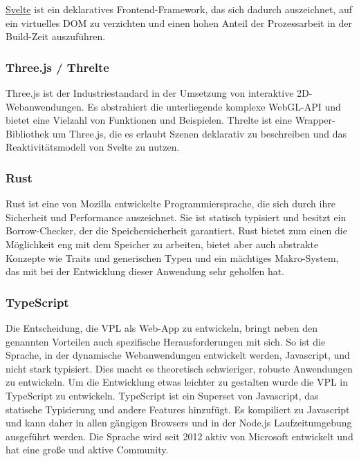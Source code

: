 \documentclass[ngerman]{article}
\begin{document}
\href{https://svelte.dev/}{Svelte} ist ein deklaratives Frontend-Framework, das sich dadurch auszeichnet, auf ein virtuelles DOM zu verzichten und einen hohen Anteil der Prozessarbeit in der Build-Zeit auszuführen.

\subsubsection{Three.js / Threlte}

Three.js ist der Industriestandard in der Umsetzung von interaktive 2D-Webanwendungen. Es abstrahiert die unterliegende komplexe WebGL-API und bietet eine Vielzahl von Funktionen und Beispielen. Threlte ist eine Wrapper-Bibliothek um Three.js, die es erlaubt Szenen deklarativ zu beschreiben und das Reaktivitätsmodell von Svelte zu nutzen.

\subsubsection{Rust}
\label{sec:Rust}

Rust ist eine von Mozilla entwickelte Programmiersprache, die sich durch ihre Sicherheit und Performance auszeichnet. Sie ist statisch typisiert und besitzt ein Borrow-Checker, der die Speichersicherheit garantiert. \cite{Jung_2020} Rust bietet zum einen die Möglichkeit eng mit dem Speicher zu arbeiten, bietet aber auch abstrakte Konzepte wie Traits und generischen Typen und ein mächtiges Makro-System, das mit bei der Entwicklung dieser Anwendung sehr geholfen hat.

\subsubsection{TypeScript}
\label{sec:TypeScript}
Die Entscheidung, die VPL als Web-App zu entwickeln, bringt neben den genannten Vorteilen auch spezifische Herausforderungen mit sich.
So ist die Sprache, in der dynamische Webanwendungen entwickelt werden, Javascript,  und nicht stark typisiert. 
Dies macht es theoretisch schwieriger, robuste Anwendungen zu entwickeln. 
Um die Entwicklung etwas leichter zu gestalten wurde die VPL in TypeScript zu entwickeln.
TypeScript ist ein Superset von Javascript, das statische Typisierung und andere Features hinzufügt. Es kompiliert zu Javascript und kann daher in allen gängigen Browsers und in der Node.js Laufzeitumgebung ausgeführt werden. Die Sprache wird seit 2012 aktiv von Microsoft entwickelt und hat eine große und aktive Community.
\end{document}
